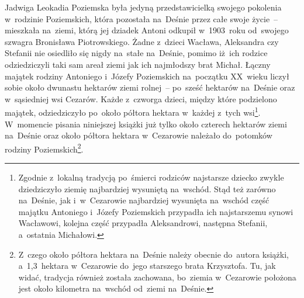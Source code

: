 Jadwiga Leokadia
Poziemska
była jedyną przedstawicielką swojego pokolenia w~rodzinie Poziemskich, która
pozostała na~Deśnie przez całe swoje życie~-- mieszkała na~ziemi, którą jej
dziadek Antoni odkupił w~1903~roku
od~swojego szwagra Bronisława Piotrowskiego. Żadne z~dzieci Wacława,
Aleksandra czy Stefanii nie osiedliło się nigdy na~stałe na~Deśnie, pomimo
iż~ich rodzice odziedziczyli taki sam areał ziemi jak ich najmłodszy brat
Michał. Łączny majątek rodziny
Antoniego
i~Józefy Poziemskich
na~początku XX~wieku liczył sobie około dwunastu hektarów ziemi rolnej~--
po~sześć hektarów na~Deśnie oraz w~sąsiedniej wsi Cezarów. Każde z~czworga
dzieci, między które podzielono majątek, odziedziczyło po~około półtora
hektara w~każdej z~tych wsi\footnote{Zgodnie z~lokalną tradycją po~śmierci
rodziców najstarsze dziecko zwykle dziedziczyło ziemię najbardziej wysuniętą
na~wschód. Stąd też zarówno na~Deśnie, jak i~w~Cezarowie najbardziej
wysunięta na~wschód część majątku Antoniego i~Józefy Poziemskich przypadła ich
najstarszemu synowi Wacławowi, kolejna część przypadła Aleksandrowi, następna
Stefanii, a~ostatnia Michałowi.}. W~momencie pisania niniejszej książki już
tylko około czterech hektarów ziemi na~Deśnie oraz około półtora hektara
w~Cezarowie należało do~potomków rodziny Poziemskich\footnote{Z~czego około
półtora hektara na~Deśnie należy obecnie do~autora
książki, a~1,3~hektara
w~Cezarowie do~jego starszego brata
Krzysztofa. Tu, jak widać,
tradycja również została zachowana, bo~ziemia w~Cezarowie położona jest około
kilometra na~wschód od~ziemi na~Deśnie.}.